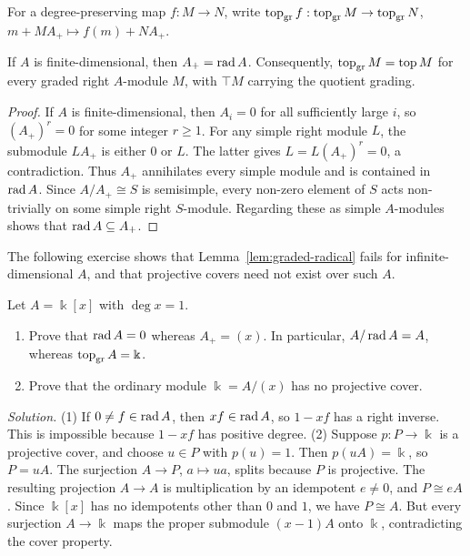 For a degree-preserving map $f:M\to N$, write
$\operatorname{top}\nolimits_{\mathrm{gr}} f:\operatorname{top}\nolimits_{\mathrm{gr}} M\to\operatorname{top}\nolimits_{\mathrm{gr}} N$, $m+MA_+\mapsto f(m)+NA_+$.

\begin{lemma}\label{lem:graded-radical}
If $A$ is finite-dimensional, then $A_+=\operatorname{rad}\nolimits A$.
Consequently, $\operatorname{top}\nolimits_{\mathrm{gr}} M=\operatorname{top}\nolimits M$ for every graded right $A$-module $M$, with $\top M$ carrying the quotient grading.
\end{lemma}

\begin{supplementary}
\begin{proof}
If $A$ is finite-dimensional, then $A_i=0$ for all sufficiently large $i$, so $(A_+)^r=0$ for some integer $r\geq1$.
For any simple right module $L$, the submodule $LA_+$ is either $0$ or $L$.
The latter gives $L=L(A_+)^r=0$, a contradiction.
Thus $A_+$ annihilates every simple module and is contained in $\operatorname{rad}\nolimits A$.
Since $A/A_+\cong S$ is semisimple, every non-zero element of $S$ acts non-trivially on some simple right $S$-module.
Regarding these as simple $A$-modules shows that $\operatorname{rad}\nolimits A\subseteq A_+$.
\end{proof}
\end{supplementary}

The following exercise shows that Lemma~\ref{lem:graded-radical} fails for infinite-dimensional $A$, and that projective covers need not exist over such $A$.

\begin{exercise}
Let $A=\Bbbk[x]$ with $\deg x=1$.
\begin{enumerate}
\item Prove that $\operatorname{rad}\nolimits A=0$ whereas $A_+=(x)$.
In particular, $A/\operatorname{rad}\nolimits A=A$, whereas $\operatorname{top}\nolimits_{\mathrm{gr}} A=\Bbbk$.
\item Prove that the ordinary module $\Bbbk=A/(x)$ has no projective cover.
\end{enumerate}
\end{exercise}

\begin{hidden}
\emph{Solution.}
(1) If $0\neq f\in\operatorname{rad}\nolimits A$, then $xf\in\operatorname{rad}\nolimits A$, so $1-xf$ has a right inverse.
This is impossible because $1-xf$ has positive degree.
(2) Suppose $p:P\to\Bbbk$ is a projective cover, and choose $u\in P$ with $p(u)=1$.
Then $p(uA)=\Bbbk$, so $P=uA$.
The surjection $A\to P$, $a\mapsto ua$, splits because $P$ is projective.
The resulting projection $A\to A$ is multiplication by an idempotent $e\neq0$, and $P\cong eA$.
Since $\Bbbk[x]$ has no idempotents other than $0$ and $1$, we have $P\cong A$.
But every surjection $A\to\Bbbk$ maps the proper submodule $(x-1)A$ onto $\Bbbk$, contradicting the cover property.
\end{hidden}

